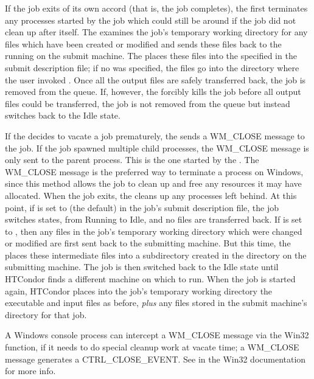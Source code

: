 If the job exits of its own accord (that is, the job completes),
the 
first terminates any processes started by the job which could still be
around if the job did not clean up after itself.
The  examines the job's temporary working directory for any
files which have been created or modified and sends these files back
to the  running on the submit machine.
The 
places these files into the  specified in the
submit description file; 
if no  was specified,
the files go into the directory where the user invoked .
Once all the output files are safely transferred back,
the job is removed from the queue.
If, however, the  forcibly kills the job before all output files
could be transferred, the job is not removed from the queue but instead
switches back to the Idle state.  

If the  decides to vacate a job prematurely,
the  sends a WM\_CLOSE message to the job.
If the job spawned multiple child processes, the WM\_CLOSE message is only
sent to the parent process.
This is the one started by the .
The WM\_CLOSE message is the preferred way to terminate a process on Windows,
since this method allows the job to clean up and free any resources it may
have allocated.
When the job exits, the  cleans up any processes left behind.
At this point, if  is set to
 (the default) in the job's submit description file,
the job switches states, from Running to Idle,
and no files are transferred back.
If  is set to ,
then any files
in the job's temporary working directory which were changed or modified are
first sent back to the submitting machine.
But this time, the  places these
intermediate files into a subdirectory created in the
 directory on the submitting machine.
The job is then switched back to the Idle state until HTCondor finds
a different machine on which to run.
When the job is started again,
HTCondor places into the job's temporary working directory the executable
and input files as before,
\emph{plus} any files stored in the submit machine's  directory for that job.  

\Note A Windows console process can intercept a WM\_CLOSE message
via the Win32  function,
if it needs to do special cleanup work at vacate time; 
a WM\_CLOSE message generates a CTRL\_CLOSE\_EVENT.
See  in the Win32
documentation for more info.

